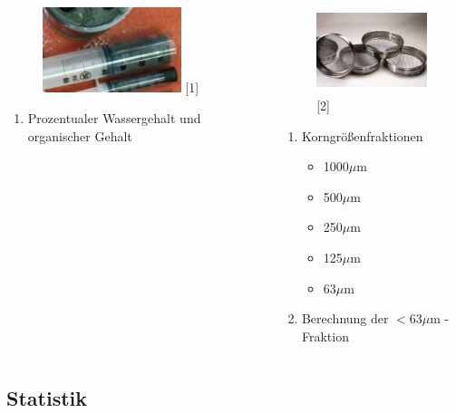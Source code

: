 \documentclass{beamer}
\begin{document}
\begin{frame}[t]
\begin{columns}[t]
\begin{column}{6.4cm}
\begin{figure}
\includegraphics[height=25mm]{images/Fotos/spritze.jpg} {\small [1]}
\hspace*{-8mm}
\end{figure}
\begin{enumerate}
\item[1] Prozentualer Wassergehalt und organischer Gehalt
\end{enumerate}
\end{column}
\begin{column}{6.4cm}
\begin{figure}
\includegraphics[height=25mm]{images/Fotos/Siebe2.jpeg} {\small [2]}
\hspace*{+8mm}
\end{figure}
\begin{enumerate}
\item[2] Korngrößenfraktionen
\begin{itemize}
\item 1000$ \mu$m 
\item 500$ \mu$m 
\item 250$ \mu$m 
\item 125$\mu$m 
\item 63$ \mu$m 
\end{itemize}
\item[3] Berechnung der $<63 \mu$m 
-Fraktion
\end{enumerate}
\end{column}
\end{columns}
\end{frame}

\subsection{Statistik}
\end{document}
